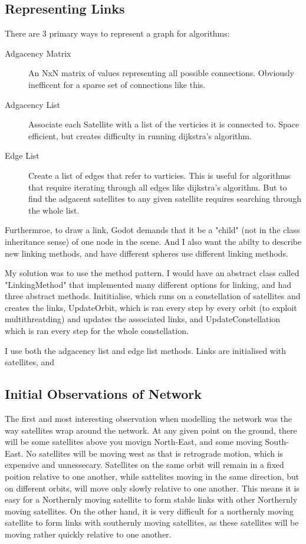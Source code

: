 \documentclass[12pt]{article}
\begin{document}
\subsection{Representing Links}

There are 3 primary ways to represent a graph for algorithms:

\begin{description}
\item[Adgacency Matrix] An NxN matrix of values representing all possible connections. Obviously inefficent for a sparse set of connections like this.
\item[Adgacency List] Associate each Satellite with a list of the verticies it is connected to. Space efficient, but creates difficulty in running dijkstra's algorithm.
\item[Edge List] Create a list of edges that refer to varticies. This is useful for algorithms that require iterating through all edges like dijkstra's algorithm. But to find the adgacent satellites to any given satellite requires searching through the whole list.
\end{description}

Furthermroe, to draw a link, Godot demands that it be a "child" (not in the class inheritance sense) of one node in the scene. And I also want the abilty to describe new linking methods, and have different spheres use different linking methods.

My solution was to use the method pattern. I would have an abstract class called "LinkingMethod" that implemented many different options for linking, and had three abstract methods. Inititialise, which runs on a constellation of satellites and creates the links, UpdateOrbit, which is ran every step by every orbit (to exploit multithreatding) and updates the associated links, and UpdateConstellation which is ran every step for the whole constellation.

I use both the adgacency list and edge list methods. Links are initialised with satellites, and %

\subsection{Initial Observations of Network}
The first and most interesting observation when modelling the network was the way satellites wrap around the network. At any given point on the ground, there will be some satellites above you movign North-East, and some moving South-East. No satellites will be moving west as that is retrograde motion, which is expensive and unnessecary. Satellites on the same orbit will remain in a fixed poition relative to one another,  while sattelites moving in the same direction, but on different orbits, will move only slowly relative to one another. This means it is easy for a Northernly moving satellite to form stable links with other Northernly moving satellites. On the other hand, it is very difficult for a northernly moving satellite to form links with southernly moving satellites, as these satellites will be moving rather quickly relative to one another.
\end{document}
